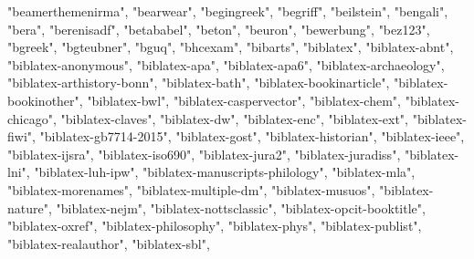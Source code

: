 \documentclass[
]{article}
\newenvironment{Shaded}{\begin{snugshade}}{\end{snugshade}}
\newcommand{\NormalTok}[1]{#1}
\newcommand{\StringTok}[1]{\textcolor[rgb]{0.31,0.60,0.02}{#1}}
\begin{document}
\begin{Shaded}
\begin{Highlighting}[]
\StringTok{"beamerthemenirma"}\NormalTok{, }\StringTok{"bearwear"}\NormalTok{, }\StringTok{"begingreek"}\NormalTok{, }\StringTok{"begriff"}\NormalTok{, }\StringTok{"beilstein"}\NormalTok{, }
\StringTok{"bengali"}\NormalTok{, }\StringTok{"bera"}\NormalTok{, }\StringTok{"berenisadf"}\NormalTok{, }\StringTok{"betababel"}\NormalTok{, }\StringTok{"beton"}\NormalTok{, }\StringTok{"beuron"}\NormalTok{, }
\StringTok{"bewerbung"}\NormalTok{, }\StringTok{"bez123"}\NormalTok{, }\StringTok{"bgreek"}\NormalTok{, }\StringTok{"bgteubner"}\NormalTok{, }\StringTok{"bguq"}\NormalTok{, }\StringTok{"bhcexam"}\NormalTok{, }
\StringTok{"bibarts"}\NormalTok{, }\StringTok{"biblatex"}\NormalTok{, }\StringTok{"biblatex{-}abnt"}\NormalTok{, }\StringTok{"biblatex{-}anonymous"}\NormalTok{, }
\StringTok{"biblatex{-}apa"}\NormalTok{, }\StringTok{"biblatex{-}apa6"}\NormalTok{, }\StringTok{"biblatex{-}archaeology"}\NormalTok{, }\StringTok{"biblatex{-}arthistory{-}bonn"}\NormalTok{, }
\StringTok{"biblatex{-}bath"}\NormalTok{, }\StringTok{"biblatex{-}bookinarticle"}\NormalTok{, }\StringTok{"biblatex{-}bookinother"}\NormalTok{, }
\StringTok{"biblatex{-}bwl"}\NormalTok{, }\StringTok{"biblatex{-}caspervector"}\NormalTok{, }\StringTok{"biblatex{-}chem"}\NormalTok{, }\StringTok{"biblatex{-}chicago"}\NormalTok{, }
\StringTok{"biblatex{-}claves"}\NormalTok{, }\StringTok{"biblatex{-}dw"}\NormalTok{, }\StringTok{"biblatex{-}enc"}\NormalTok{, }\StringTok{"biblatex{-}ext"}\NormalTok{, }
\StringTok{"biblatex{-}fiwi"}\NormalTok{, }\StringTok{"biblatex{-}gb7714{-}2015"}\NormalTok{, }\StringTok{"biblatex{-}gost"}\NormalTok{, }\StringTok{"biblatex{-}historian"}\NormalTok{, }
\StringTok{"biblatex{-}ieee"}\NormalTok{, }\StringTok{"biblatex{-}ijsra"}\NormalTok{, }\StringTok{"biblatex{-}iso690"}\NormalTok{, }\StringTok{"biblatex{-}jura2"}\NormalTok{, }
\StringTok{"biblatex{-}juradiss"}\NormalTok{, }\StringTok{"biblatex{-}lni"}\NormalTok{, }\StringTok{"biblatex{-}luh{-}ipw"}\NormalTok{, }\StringTok{"biblatex{-}manuscripts{-}philology"}\NormalTok{, }
\StringTok{"biblatex{-}mla"}\NormalTok{, }\StringTok{"biblatex{-}morenames"}\NormalTok{, }\StringTok{"biblatex{-}multiple{-}dm"}\NormalTok{, }
\StringTok{"biblatex{-}musuos"}\NormalTok{, }\StringTok{"biblatex{-}nature"}\NormalTok{, }\StringTok{"biblatex{-}nejm"}\NormalTok{, }\StringTok{"biblatex{-}nottsclassic"}\NormalTok{, }
\StringTok{"biblatex{-}opcit{-}booktitle"}\NormalTok{, }\StringTok{"biblatex{-}oxref"}\NormalTok{, }\StringTok{"biblatex{-}philosophy"}\NormalTok{, }
\StringTok{"biblatex{-}phys"}\NormalTok{, }\StringTok{"biblatex{-}publist"}\NormalTok{, }\StringTok{"biblatex{-}realauthor"}\NormalTok{, }\StringTok{"biblatex{-}sbl"}\NormalTok{, }

\end{Highlighting}
\end{Shaded}
\end{document}
